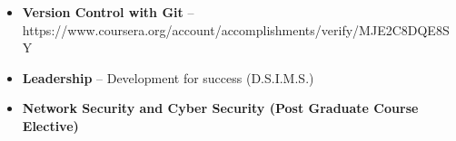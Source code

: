 


\begin{itemize}
    \item \small \textbf{Version Control with Git} -- https://www.coursera.org/account/accomplishments/verify/MJE2C8DQE8SY
    \vspace{0.2em}
    \item \small \textbf{Leadership} -- Development for success (D.S.I.M.S.)
    \vspace{0.2em}
    \item \small \textbf{Network Security and Cyber Security (Post Graduate Course Elective)}
\end{itemize}